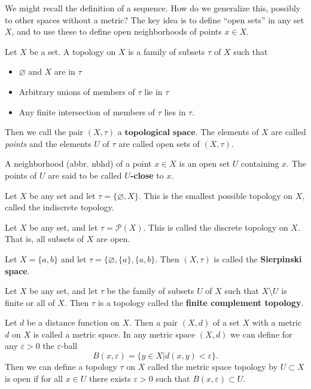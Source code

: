 We might recall the definition of a sequence. How do we generalize this, possibly to other spaces without a metric? The key idea is to define ``open sets'' in any set $X$, and to use these to define open neighborhoods of points $x \in X$.

\begin{definition}
Let $X$ be a set. A topology on $X$ is a family of subsets $\tau$ of $X$ such that 
\begin{itemize}
	\item $\varnothing$ and $X$ are in $\tau$
	\item Arbitrary unions of members of $\tau$ lie in $\tau$
	\item Any finite intersection of members of $\tau$ lies in $\tau$.
\end{itemize}
Then we call the pair $(X, \tau)$ a $\textbf{topological space}$. The elements of $X$ are called \textit{points} and the elements $U$ of $\tau$ are called open sets of $(X, \tau)$. 
\end{definition}
\begin{definition}
A neighborhood (abbr. nbhd) of a point $x \in X$ is an open set $U$ containing $x$. The points of $U$ are said to be called \textbf{$U$-close} to $x$.
\end{definition}

\begin{example}
Let $X$ be any set and let $\tau = \{\varnothing, X\}$. This is the smallest possible topology on $X$, called the indiscrete topology.

Let $X$ be any set, and let $\tau = \mathcal{P}(X)$. This is called the discrete topology on $X$. That is, all subsets of $X$ are open.

Let $X = \{a,b\}$ and let $\tau = \{\varnothing, \{a\}, \{a, b\}$. Then $(X, \tau)$ is called the \textbf{Sierpinski space}.

Let $X$ be any set, and let $\tau$ be the family of subsets $U$ of $X$ such that $X \setminus U$ is finite or all of $X$. Then $\tau$ is a topology called the \textbf{finite complement topology}.

Let $d$ be a distance function on $X$. Then a pair $(X, d)$ of a set $X$ with a metric $d$ on $X$ is called a metric space. In any metric space $(X, d)$ we can define for any $\varepsilon > 0$ the $\varepsilon$-ball 
\[B(x, \varepsilon) = \{y \in X | d(x, y) < \varepsilon\}.\]
Then we can define a topology $\tau$ on $X$ called the metric space topology by $U \subset X$ is open if for all $x \in U$ there exists $\varepsilon > 0$ such that $B(x, \varepsilon) \subset U$. 
\end{example}

